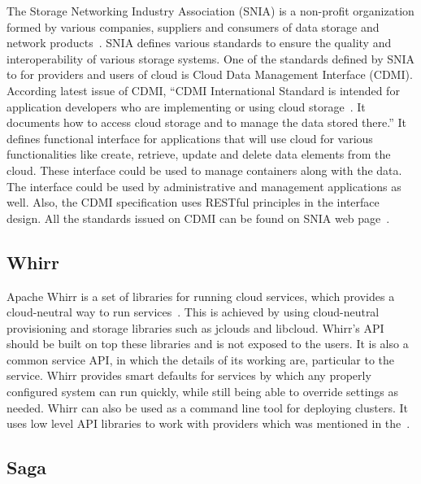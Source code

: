 {The Storage Networking Industry Association (SNIA) is a non-profit
organization formed by various companies, suppliers and consumers of
data storage and network products~\cite{www-sniawebsite}. SNIA defines
various standards to ensure the quality and interoperability of
various storage systems. One of the standards defined by SNIA to for
providers and users of cloud is Cloud Data Management Interface
(CDMI). According latest issue of CDMI, ``CDMI International Standard
is intended for application developers who are implementing or using
cloud storage~\cite{cdmi-manual}. It documents how to access cloud
storage and to manage the data stored there.'' It defines functional
interface for applications that will use cloud for various
functionalities like create, retrieve, update and delete data elements
from the cloud. These interface could be used to manage containers
along with the data. The interface could be used by administrative and
management applications as well. Also, the CDMI specification uses
RESTful principles in the interface design. All the standards issued
on CDMI can be found on SNIA web page~\cite{www-cdmiwebsite}.


     \pv

\subsection{Whirr}
     
Apache Whirr is a set of libraries for running cloud services, which
provides a cloud-neutral way to run
services~\cite{www-ApacheWhirr}. This is achieved by using
cloud-neutral provisioning and storage libraries such as jclouds and
libcloud. Whirr's API should be built on top these libraries and is
not exposed to the users. It is also a common service API, in which
the details of its working are, particular to the service.  Whirr
provides smart defaults for services by which any properly configured
system can run quickly, while still being able to override settings as
needed. Whirr can also be used as a command line tool for deploying
clusters. It uses low level API libraries to work with providers which
was mentioned in the~\cite{www-slideshare-ApacheWhirr}.

     
\subsection{Saga}

}
